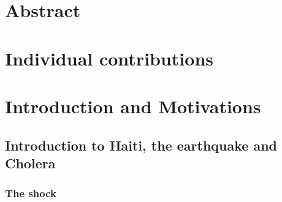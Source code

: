 \documentclass[11pt]{article}
\begin{document}






\tableofcontents

\newpage




\section{Abstract}

\section{Individual contributions}



















\section{Introduction and Motivations}
\subsection{Introduction to Haiti, the earthquake and Cholera }
\subsubsection*{The shock}
\end{document}
